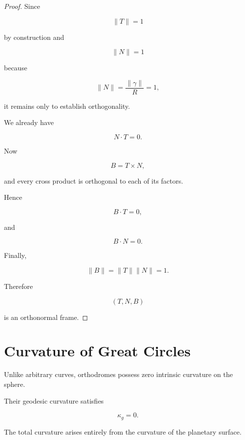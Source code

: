 \documentclass[11pt,fleqn]{book}
\numberwithin{equation}{chapter}
\theoremstyle{plain}
\theoremstyle{definition}
\theoremstyle{remark}
\begin{document}
\begin{proof}

Since

\[
\|T\|=1
\]

by construction and

\[
\|N\|=1
\]

because

\[
\|N\|
=
\frac{\|\gamma\|}{R}
=
1,
\]

it remains only to establish orthogonality.

We already have

\[
N\cdot T=0.
\]

Now

\[
B=T\times N,
\]

and every cross product is orthogonal to each of its factors.

Hence

\[
B\cdot T=0,
\]

and

\[
B\cdot N=0.
\]

Finally,

\[
\|B\|
=
\|T\|
\|N\|
=
1.
\]

Therefore

\[
(T,N,B)
\]

is an orthonormal frame.

\end{proof}


\section{Curvature of Great Circles}

Unlike arbitrary curves, orthodromes possess zero intrinsic curvature on
the sphere.

Their geodesic curvature satisfies

\[
\kappa_g=0.
\]

The total curvature arises entirely from the curvature of the planetary
surface.

\end{document}

